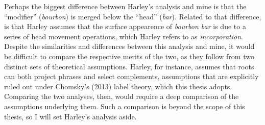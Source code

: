\documentclass[MilwayThesis]{subfiles}
\begin{document}
Perhaps the biggest difference between Harley's analysis and mine is that the ``modifier'' (\textit{bourbon}) is merged below the ``head'' (\textit{bar}).
Related to that difference, is that Harley assumes that the surface appearence of \textit{bourbon bar} is due to a series of head movement operations, which Harley refers to as \textit{incorporation}.
Despite the similarities and differences between this analysis and mine, it would be difficult to compare the respective merits of the two, as they follow from two distinct sets of theoretical assumptions.
Harley, for instance, assumes that roots can both project phrases and select complements, assumptions that are explicitly ruled out under Chomsky's (2013) label theory, which this thesis adopts.
Comparing the two analyses, then, would require a deep comparison of the assumptions underlying them.
Such a comparison is beyond the scope of this thesis, so I will set Harley's analysis aside.
\end{document}
